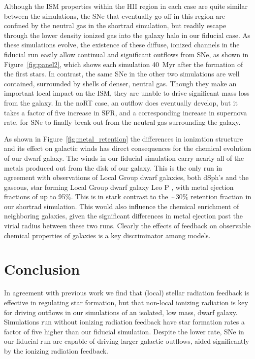 \documentclass[twocolumn]{aastex62}
\begin{document}
Although the ISM properties within the HII region in each case are quite similar between the simulations, the SNe that eventually go off in this region are confined by the neutral gas in the shortrad simulation, but readily escape through the lower density ionized gas into the galaxy halo in our fiducial case. As these simulations evolve, the existence of these diffuse, ionized channels in the fiducial run easily allow continual and significant outflows from SNe, as shown in  Figure~\ref{fig:panel2}, which shows each simulation 40~Myr after the formation of the first stars. In contrast, the same SNe in the other two simulations are well contained, surrounded by shells of denser, neutral gas. Though they make an important local impact on the ISM, they are unable to drive significant mass loss from the galaxy. In the noRT case, an outflow does eventually develop, but it takes a factor of five increase in SFR, and a corresponding increase in supernova rate, for SNe to finally break out from the neutral gas surrounding the galaxy. 

As shown in Figure~\ref{fig:metal_retention} the differences in ionization structure and its effect on galactic winds has direct consequences for the chemical evolution of our dwarf galaxy. The winds in our fiducial simulation carry nearly all of the metals produced out from the disk of our galaxy. This is the only run in agreement with observations of Local Group dwarf galaxies, both dSph's \citep{Kirby2011} and the gaseous, star forming Local Group dwarf galaxy Leo P \citep{McQuinn2015}, with metal ejection fractions of up to 95\%. This is in stark contrast to the $\sim$30\% retention fraction in our shortrad simulation. This would also influence the chemical enrichment of neighboring galaxies, given the significant differences in metal ejection past the virial radius between these two runs. Clearly the effects of feedback on observable chemical properties of galaxies is a key discriminator among models.

\section{Conclusion}  \label{sec:conclusion}
In agreement with previous work we find that (local) stellar radiation feedback is effective in regulating star formation, but that non-local ionizing radiation is key for driving outflows in our simulations of an isolated, low mass, dwarf galaxy. Simulations run without ionizing radiation feedback have star formation rates a factor of five higher than our fiducial simulation. Despite the lower rate, SNe in our fiducial run are capable of driving larger galactic outflows, aided significantly by the ionizing radiation feedback.
\end{document}
